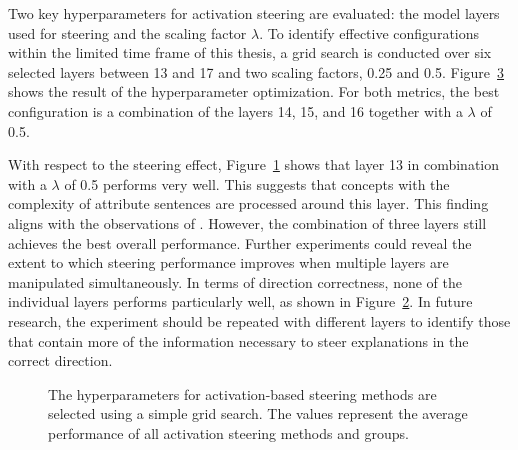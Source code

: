 Two key hyperparameters for activation steering are evaluated: the model layers used for steering and the scaling factor \(\lambda\). To identify effective configurations within the limited time frame of this thesis, a grid search is conducted over six selected layers between \num{13} and \num{17} and two scaling factors, \num{0.25} and \num{0.5}. Figure~\ref{fig:activationSteeringHPO} shows the result of the hyperparameter optimization. For both metrics, the best configuration is a combination of the layers \num{14}, \num{15}, and \num{16} together with a \(\lambda\) of \num{0.5}.

With respect to the steering effect, Figure~\ref{fig:activationSteeringHPO:steeringEffect} shows that layer \num{13} in combination with a \(\lambda\) of \num{0.5} performs very well. This suggests that concepts with the complexity of attribute sentences are processed around this layer. This finding aligns with the observations of \citet{konenStyleVectorsSteering2024,bogdanEmergentEffectsScaling2025}. However, the combination of three layers still achieves the best overall performance. Further experiments could reveal the extent to which steering performance improves when multiple layers are manipulated simultaneously. In terms of direction correctness, none of the individual layers performs particularly well, as shown in Figure~\ref{fig:activationSteeringHPO:directionCorrectness}. In future research, the experiment should be repeated with different layers to identify those that contain more of the information necessary to steer explanations in the correct direction.

\begin{figure}[ht]
  \begin{subfigure}[t]{0.49\linewidth}
    \label{fig:activationSteeringHPO:steeringEffect}
  \end{subfigure}
  \hfill
  \begin{subfigure}[t]{0.49\linewidth}
    \label{fig:activationSteeringHPO:directionCorrectness}
  \end{subfigure}
  \caption{The hyperparameters for activation-based steering methods are selected using a simple grid search. The values represent the average performance of all activation steering methods and groups.}%
  \label{fig:activationSteeringHPO}
\end{figure}


